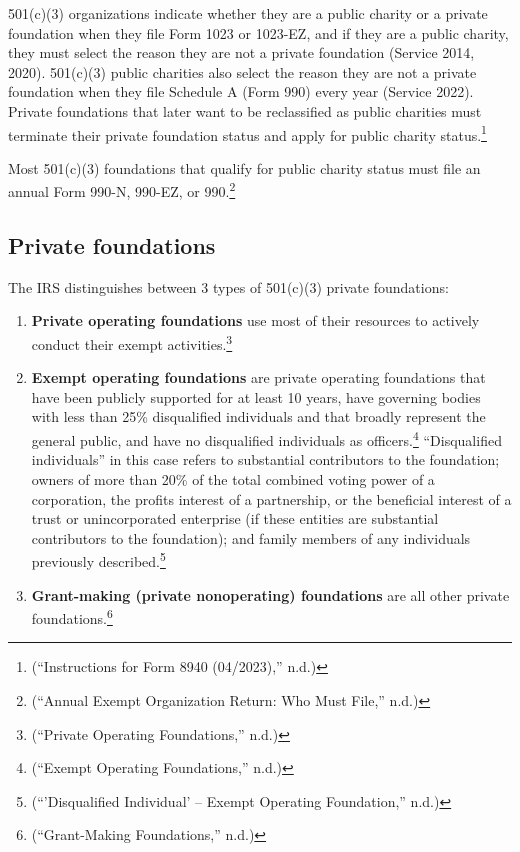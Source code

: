 \documentclass[
  letterpaper,
  DIV=11,
  numbers=noendperiod]{scrreprt}
\providecommand{\tightlist}{%
  \setlength{\itemsep}{0pt}\setlength{\parskip}{0pt}}\usepackage{longtable,booktabs,array}
\begin{document}
501(c)(3) organizations indicate whether they are a public charity or a
private foundation when they file Form 1023 or 1023-EZ, and if they are
a public charity, they must select the reason they are not a private
foundation (Service 2014, 2020). 501(c)(3) public charities also select
the reason they are not a private foundation when they file Schedule A
(Form 990) every year (Service 2022). Private foundations that later
want to be reclassified as public charities must terminate their private
foundation status and apply for public charity status.\footnote{({``Instructions
  for Form 8940 (04/2023),''} n.d.)}

Most 501(c)(3) foundations that qualify for public charity status must
file an annual Form 990-N, 990-EZ, or 990.\footnote{({``Annual Exempt
  Organization Return: Who Must File,''} n.d.)}

\hypertarget{private-foundations}{%
\subsection{Private foundations}\label{private-foundations}}

The IRS distinguishes between 3 types of 501(c)(3) private foundations:

\begin{enumerate}
\def\labelenumi{\arabic{enumi}.}
\tightlist
\item
  \textbf{Private operating foundations} use most of their resources to
  actively conduct their exempt activities.\footnote{({``Private
    Operating Foundations,''} n.d.)}
\item
  \textbf{Exempt operating foundations} are private operating
  foundations that have been publicly supported for at least 10 years,
  have governing bodies with less than 25\% disqualified individuals and
  that broadly represent the general public, and have no disqualified
  individuals as officers.\footnote{({``Exempt Operating Foundations,''}
    n.d.)} ``Disqualified individuals'' in this case refers to
  substantial contributors to the foundation; owners of more than 20\%
  of the total combined voting power of a corporation, the profits
  interest of a partnership, or the beneficial interest of a trust or
  unincorporated enterprise (if these entities are substantial
  contributors to the foundation); and family members of any individuals
  previously described.\footnote{({``'Disqualified Individual' -- Exempt
    Operating Foundation,''} n.d.)}
\item
  \textbf{Grant-making (private nonoperating) foundations} are all other
  private foundations.\footnote{({``Grant-Making Foundations,''} n.d.)}
\end{enumerate}
\end{document}
